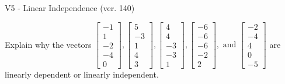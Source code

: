 \begin{exercise}
  \begin{exerciseTitle}V5 - Linear Independence (ver. 140)\end{exerciseTitle}
  \begin{exerciseStatement}
    Explain why the vectors \(\left[\begin{array}{r}
-1 \\
1 \\
-2 \\
-4 \\
0
\end{array}\right] , \left[\begin{array}{r}
5 \\
-3 \\
1 \\
4 \\
3
\end{array}\right] , \left[\begin{array}{r}
4 \\
4 \\
-3 \\
-3 \\
1
\end{array}\right] , \left[\begin{array}{r}
-6 \\
-6 \\
-6 \\
-2 \\
2
\end{array}\right] , \text{ and } \left[\begin{array}{r}
-2 \\
-4 \\
4 \\
0 \\
-5
\end{array}\right]\) are linearly dependent or linearly independent.	



\end{exerciseStatement}
\end{exercise}
